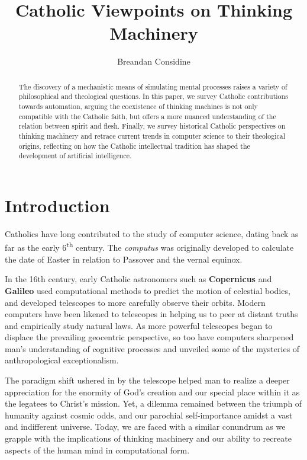 \documentclass[sigplan,nonacm]{acmart}\settopmatter{printfolios=false,printccs=false,printacmref=false}
\begin{document}
\title{Catholic Viewpoints on Thinking Machinery}
\begin{abstract}
  The discovery of a mechanistic means of simulating mental processes raises a variety of philosophical and theological questions. In this paper, we survey Catholic contributions towards automation, arguing the coexistence of thinking machines is not only compatible with the Catholic faith, but offers a more nuanced understanding of the relation between spirit and flesh. Finally, we survey historical Catholic perspectives on thinking machinery and retrace current trends in computer science to their theological origins, reflecting on how the Catholic intellectual tradition has shaped the development of artificial intelligence.
\end{abstract}

\author{Breandan Considine}

\maketitle

\section{Introduction}

Catholics have long contributed to the study of computer science, dating back as far as the early 6\textsuperscript{th} century. The \textit{computus} was originally developed to calculate the date of Easter in relation to Passover and the vernal equinox.

In the 16th century, early Catholic astronomers such as \textbf{Copernicus} and \textbf{Galileo} used computational methods to predict the motion of celestial bodies, and developed telescopes to more carefully observe their orbits. Modern computers have been likened to telescopes in helping us to peer at distant truths and empirically study natural laws. As more powerful telescopes began to displace the prevailing geocentric perspective, so too have computers sharpened man's understanding of cognitive processes and unveiled some of the mysteries of anthropological exceptionalism.

The paradigm shift ushered in by the telescope helped man to realize a deeper appreciation for the enormity of God's creation and our special place within it as the legatees to Christ's mission. Yet, a dilemma remained between the triumph of humanity against cosmic odds, and our parochial self-importance amidst a vast and indifferent universe. Today, we are faced with a similar conundrum as we grapple with the implications of thinking machinery and our ability to recreate aspects of the human mind in computational form.
\end{document}

